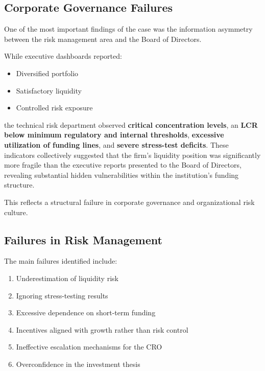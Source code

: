 \vspace{0.3cm}

\subsection{Corporate Governance Failures}

One of the most important findings of the case was the information asymmetry between the risk management area and the Board of Directors.

While executive dashboards reported:

\begin{itemize}
    \item Diversified portfolio
    \item Satisfactory liquidity
    \item Controlled risk exposure
\end{itemize}

the technical risk department observed \textbf{critical concentration levels}, an \textbf{LCR below minimum regulatory and internal thresholds}, \textbf{excessive utilization of funding lines}, and \textbf{severe stress-test deficits}. These indicators collectively suggested that the firm's liquidity position was significantly more fragile than the executive reports presented to the Board of Directors, revealing substantial hidden vulnerabilities within the institution's funding structure.

This reflects a structural failure in corporate governance and organizational risk culture.

\vspace{0.3cm}

\subsection{Failures in Risk Management}

The main failures identified include:

\begin{enumerate}
    \item Underestimation of liquidity risk
    \item Ignoring stress-testing results
    \item Excessive dependence on short-term funding
    \item Incentives aligned with growth rather than risk control
    \item Ineffective escalation mechanisms for the CRO
    \item Overconfidence in the investment thesis
\end{enumerate}

